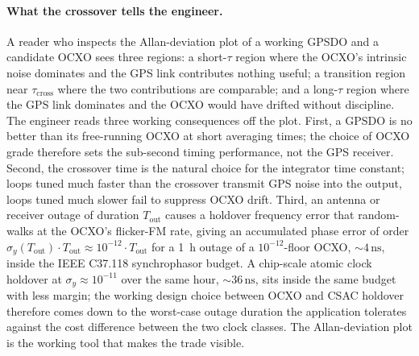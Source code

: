 \paragraph{What the crossover tells the engineer.} A reader who
inspects the Allan-deviation plot of a working GPSDO and a candidate
OCXO sees three regions: a short-$\tau$ region where the OCXO's
intrinsic noise dominates and the GPS link contributes nothing
useful; a transition region near $\tau_{\text{cross}}$ where the
two contributions are comparable; and a long-$\tau$ region where
the GPS link dominates and the OCXO would have drifted without
discipline. The engineer reads three working consequences off the
plot. First, a GPSDO is no better than its free-running OCXO at
short averaging times; the choice of OCXO grade therefore sets the
sub-second timing performance, not the GPS receiver. Second, the
crossover time is the natural choice for the integrator time
constant; loops tuned much faster than the crossover transmit GPS
noise into the output, loops tuned much slower fail to suppress
OCXO drift. Third, an antenna or receiver outage of duration
$T_{\text{out}}$ causes a holdover frequency error that random-
walks at the OCXO's flicker-FM rate, giving an accumulated phase
error of order $\sigma_{y}(T_{\text{out}}) \cdot T_{\text{out}}
\approx 10^{-12} \cdot T_{\text{out}}$ for a 1 \,\si{\hour}
outage of a $10^{-12}$-floor OCXO, $\sim 4 \,\si{\nano\second}$,
inside the IEEE C37.118 synchrophasor budget. A chip-scale atomic
clock holdover at $\sigma_{y} \approx 10^{-11}$ over the same
hour, $\sim 36 \,\si{\nano\second}$, sits inside the same budget
with less margin; the working design choice between OCXO and CSAC
holdover therefore comes down to the worst-case outage duration
the application tolerates against the cost difference between the
two clock classes. The Allan-deviation plot is the working tool
that makes the trade visible.

